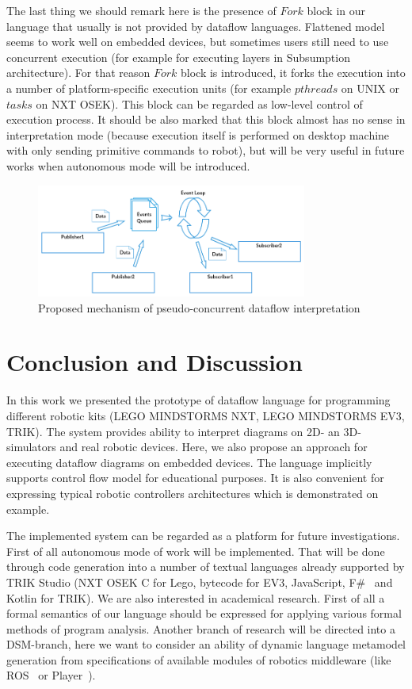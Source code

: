 \documentclass[conference,compsoc]{IEEEtran}
\begin{document}
The last thing we should remark here is the presence of $Fork$ block in our language that usually is not provided by dataflow languages. Flattened model seems to work well on embedded devices, but sometimes users still need to use concurrent execution (for example for executing layers in Subsumption architecture). For that reason $Fork$ block is introduced, it forks the execution into a number of platform-specific execution units (for example $pthreads$ on UNIX or $tasks$ on NXT OSEK). This block can be regarded as low-level control of execution process. It should be also marked that this block almost has no sense in interpretation mode (because execution itself is performed on desktop machine with only sending primitive commands to robot), but will be very useful in future works when autonomous mode will be introduced.

\begin{figure}[ht]
	\centering
	\includegraphics[width=3.5in]{Interaction.png}
	\caption{Proposed mechanism of pseudo-concurrent dataflow interpretation}
	\label{image:interpreter-interaction}
\end{figure}


\section{Conclusion and Discussion}
\label{sec:Conclusion}
In this work we presented the prototype of dataflow language for programming different robotic kits (LEGO MINDSTORMS NXT, LEGO MINDSTORMS EV3, TRIK). The system provides ability to interpret diagrams on 2D- an 3D-simulators and real robotic devices. Here, we also propose an approach for executing dataflow diagrams on embedded devices. The language implicitly supports control flow model for educational purposes. It is also convenient for expressing typical robotic controllers architectures which is demonstrated on example.

The implemented system can be regarded as a platform for future investigations. First of all autonomous mode of work will be implemented. That will be done through code generation into a number of textual languages already supported by TRIK Studio (NXT OSEK C for Lego, bytecode for EV3, JavaScript, F\#~\cite{kirsanov2014robotics} and Kotlin for TRIK). We are also interested in academical research. First of all a formal semantics of our language should be expressed for applying various formal methods of program analysis. Another branch of research will be directed into a DSM-branch, here we want to consider an ability of dynamic language metamodel generation from specifications of available modules of robotics middleware (like ROS~\cite{quigley2009ros} or Player~\cite{gerkey2003player}).

\newpage


\end{document}
